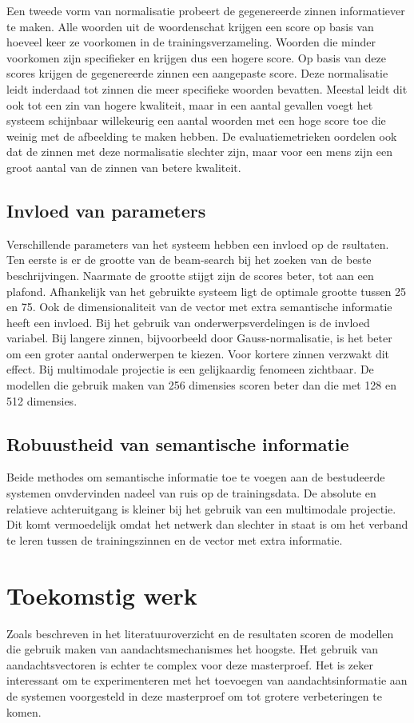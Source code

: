 Een tweede vorm van normalisatie probeert de gegenereerde zinnen informatiever te maken. Alle woorden uit de woordenschat krijgen een score op basis van hoeveel keer ze voorkomen in de trainingsverzameling. Woorden die minder voorkomen zijn specifieker en krijgen dus een hogere score. Op basis van deze scores krijgen de gegenereerde zinnen een aangepaste score. Deze normalisatie leidt inderdaad tot zinnen die meer specifieke woorden bevatten. Meestal leidt dit ook tot een zin van hogere kwaliteit, maar in een aantal gevallen voegt het systeem schijnbaar willekeurig een aantal woorden met een hoge score toe die weinig met de afbeelding te maken hebben. De evaluatiemetrieken oordelen ook dat de zinnen met deze normalisatie slechter zijn, maar voor een mens zijn een groot aantal van de zinnen van betere kwaliteit.
\subsection{Invloed van parameters}
Verschillende parameters van het systeem hebben een invloed op de rsultaten. Ten eerste is er de grootte van de beam-search bij het zoeken van de beste beschrijvingen. Naarmate de grootte stijgt zijn de scores beter, tot aan een plafond. Afhankelijk van het gebruikte systeem ligt de optimale grootte tussen 25 en 75. Ook de dimensionaliteit van de vector met extra semantische informatie heeft een invloed. Bij het gebruik van onderwerpsverdelingen is de invloed variabel. Bij langere zinnen, bijvoorbeeld door Gauss-normalisatie, is het beter om een groter aantal onderwerpen te kiezen. Voor kortere zinnen verzwakt dit effect. Bij multimodale projectie is een gelijkaardig fenomeen zichtbaar. De modellen die gebruik maken van 256 dimensies scoren beter dan die met 128 en 512 dimensies. 
\subsection{Robuustheid van semantische informatie}
Beide methodes om semantische informatie toe te voegen aan de bestudeerde systemen onvdervinden nadeel van ruis op de trainingsdata. De absolute en relatieve achteruitgang is kleiner bij het gebruik van een multimodale projectie. Dit komt vermoedelijk omdat het netwerk dan slechter in staat is om het verband te leren tussen de trainingszinnen en de vector met extra informatie.
\section{Toekomstig werk}
Zoals beschreven in het literatuuroverzicht en de resultaten scoren de modellen die gebruik maken van aandachtsmechanismes het hoogste. Het gebruik van aandachtsvectoren is echter te complex voor deze masterproef. Het is zeker interessant om te experimenteren met het toevoegen van aandachtsinformatie aan de systemen voorgesteld in deze masterproef om tot grotere verbeteringen te komen. 

